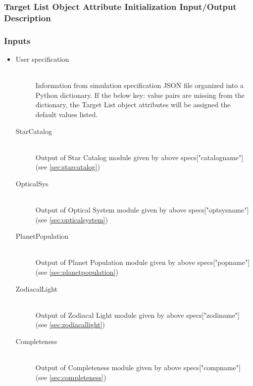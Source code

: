 \documentclass[cleanfoot]{asme2ej}
\begin{document}
\label{sec:targetlist}
\subsubsection{Target List Object Attribute Initialization Input/Output Description}
\subsubsection*{Inputs}
\begin{itemize}
    \item 
    \begin{description}
        \item[User specification] \hfill \\
        Information from simulation specification JSON file organized into a Python dictionary. If the below key: value pairs are missing from the dictionary, the Target List object attributes will be assigned the default values listed.
        \item[StarCatalog] \hfill \\
        Output of Star Catalog module given by above specs["catalogname"] (see \ref{sec:starcatalog})
        \item[OpticalSys] \hfill \\
        Output of Optical System module given by above specs["optsysname"] (see \ref{sec:opticalsystem})
        \item[PlanetPopulation] \hfill \\
        Output of Planet Population module given by above specs["popname"] (see \ref{sec:planetpopulation})
        \item[ZodiacalLight] \hfill \\
        Output of Zodiacal Light module given by above specs["zodiname"] (see \ref{sec:zodiacallight})
        \item[Completeness] \hfill \\
        Output of Completeness module given by above specs["compname"] (see \ref{sec:completeness})
    \end{description}
\end{itemize}
\end{document}
